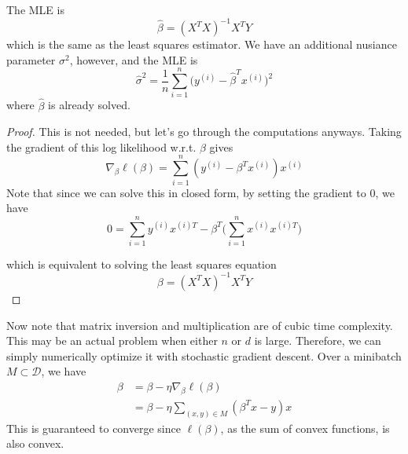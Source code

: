   \begin{corollary}
    The MLE is 
    \begin{equation}
      \hat{\beta} = (X^T X)^{-1} X^T Y
    \end{equation}
    which is the same as the least squares estimator. We have an additional nusiance parameter $\sigma^2$, however, and the MLE is 
    \begin{equation}
      \hat{\sigma}^2 = \frac{1}{n} \sum_{i=1}^n \big( y^{(i)} - \hat{\beta}^T x^{(i)} \big)^2
    \end{equation}
    where $\hat{\beta}$ is already solved. 
  \end{corollary}
  \begin{proof}
    This is not needed, but let's go through the computations anyways. Taking the gradient of this log likelihood w.r.t. $\beta$ gives 
    \begin{equation}
      \nabla_\beta \ell (\beta) = \sum_{i=1}^n ( y^{(i)} - \beta^T x^{(i)}) x^{(i)}
    \end{equation}
    Note that since we can solve this in closed form, by setting the gradient to $0$, we have 
    \begin{equation}
      0 = \sum_{i=1}^n y^{(i)} x^{(i) T} - \beta^T \bigg( \sum_{i=1}^n x^{(i)} x^{(i) T} \bigg)
    \end{equation}

    which is equivalent to solving the least squares equation 
    \begin{equation}
      \beta = ( X^T X)^{-1} X^T Y
    \end{equation}
  \end{proof}

  Now note that matrix inversion and multiplication are of cubic time complexity. This may be an actual problem when either $n$ or $d$ is large. Therefore, we can simply numerically optimize it with stochastic gradient descent. Over a minibatch $M \subset \mathcal{D}$, we have 
  \begin{align}
    \beta & = \beta - \eta \nabla_\beta \ell (\beta) \\
    & = \beta - \eta \sum_{(x, y) \in M} (\beta^T x - y) x
  \end{align}
  This is guaranteed to converge since $\ell(\beta)$, as the sum of convex functions, is also convex.  


